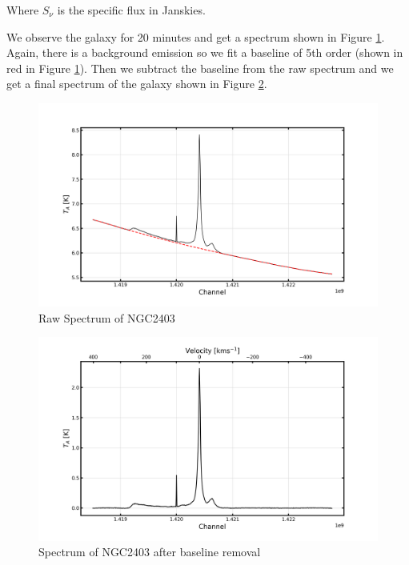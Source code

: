 \documentclass[12pt]{article}
\begin{document}
Where $S_{\nu}$ is the specific flux in Janskies. 

We observe the galaxy for 20 minutes and get a spectrum shown in Figure \ref{fig4.1}. Again, there is a background emission so we fit a baseline of 5th order (shown in red in Figure \ref{fig4.1}). Then we subtract the baseline from the raw spectrum and we get a final spectrum of the galaxy shown in Figure \ref{fig4.2}.

\begin{figure}[H]
    \centering
    \includegraphics [width = \textwidth]{fig/galaxy.png}
    \caption{Raw Spectrum of  NGC2403}
    \label{fig4.1}
\end{figure}

\begin{figure}[H]
    \centering
    \includegraphics[width = \textwidth]{fig/galaxy_baseline_removal.png}
    \caption{Spectrum of NGC2403 after baseline removal}
    \label{fig4.2}
\end{figure}
\end{document}
